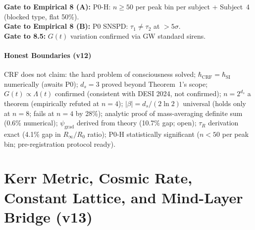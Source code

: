 \documentclass[12pt, a4paper]{article}
\begin{document}
\begin{center}
\textbf{Gate to Empirical 8 (A):} P0-H: $n \geq 50$ per peak bin per subject + Subject~4 (blocked type, flat 50\%).\\
\textbf{Gate to Empirical 8 (B):} P0 SNSPD: $\tau_1 \neq \tau_2$ at $>5\sigma$.\\
\textbf{Gate to 8.5:} $G(t)$ variation confirmed via GW standard sirens.
\end{center}

\subsection{Honest Boundaries (v12)}

CRF does not claim: the hard problem of consciousness solved; $\hbar_{\mathrm{CRF}} = \hbar_{\mathrm{SI}}$
numerically (awaits P0); $d_s = 3$ proved beyond Theorem~1's scope; $G(t)\propto\Lambda(t)$
confirmed (consistent with DESI 2024, not confirmed); $n = 2^{d_s}$ a theorem
(empirically refuted at $n = 4$); $|\beta| = d_s/(2\ln 2)$ universal (holds only at $n = 8$;
fails at $n = 4$ by 28\%); analytic proof of mass-averaging definite sum (0.6\% numerical);
$\psi_{\mathrm{grad}}$ derived from theory (10.7\% gap; open); $\tau_R$ derivation exact
(4.1\% gap in $R_\infty/R_0$ ratio); P0-H statistically significant ($n < 50$ per peak bin;
pre-registration protocol ready).

\part{Kerr Metric, Cosmic Rate, Constant Lattice, and Mind-Layer Bridge (v13)}
\end{document}
